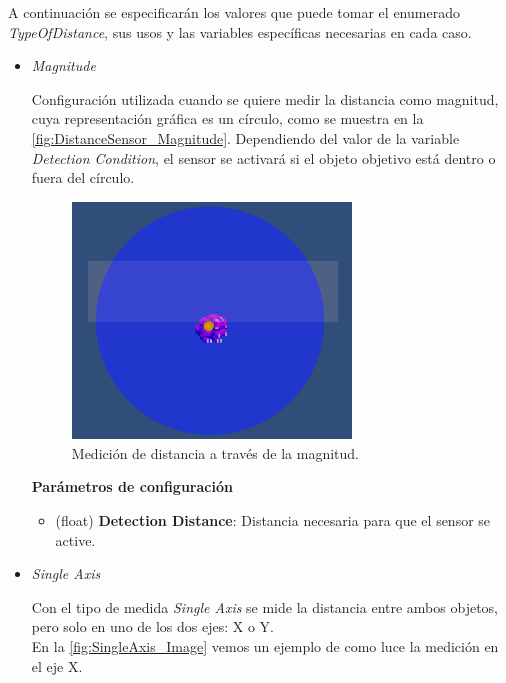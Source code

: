 A continuación se especificarán los valores que puede tomar el enumerado \textit{TypeOfDistance}, sus usos y las variables específicas necesarias en cada caso.\\
\begin{itemize}
	\item \textit{Magnitude}

Configuración utilizada cuando se quiere medir la distancia como magnitud, cuya representación gráfica es un círculo, como se muestra en la \autoref{fig:DistanceSensor_Magnitude}. Dependiendo del valor de la variable \textit{Detection Condition}, el sensor se activará si el objeto objetivo está dentro o fuera del círculo.\\
\begin{figure}[t]
	\centering
	\includegraphics[width = 0.7\textwidth]{Imagenes/DistanceSensorMagnitude.png}
	\caption{Medición de distancia a través de la magnitud.}
	\label{fig:DistanceSensor_Magnitude}
\end{figure}

\textbf{Parámetros de configuración}
	\begin{itemize}
	        \item (float) \textbf{Detection Distance}: Distancia necesaria para que el sensor se active.
	 \end{itemize}

	\item \textit{Single Axis}

Con el tipo de medida \textit{Single Axis} se mide la distancia entre ambos objetos, pero solo en uno de los dos ejes: X o Y.\\
En la \autoref{fig:SingleAxis_Image} vemos un ejemplo de como luce la medición en el eje X.\\


\end{itemize}
